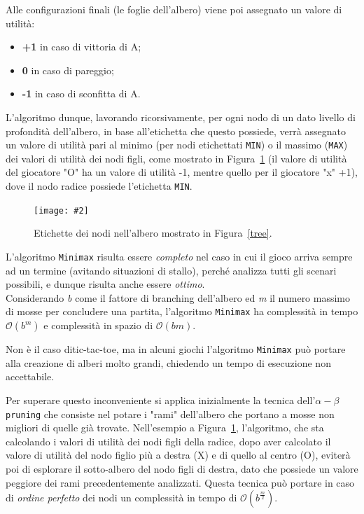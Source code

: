 \documentclass[11pt, a4paper]{article}
\newcommand{\tic}{tic-tac-toe}
\newcommand{\comp}[1]{$\mathcal{O}(#1)$}
\newcommand{\image}[4]{
	\begin{figure}[H]
		\centering
		\texttt{[image: \#2]}
		\caption{#3.}
		\label{#4}
	\end{figure}
}
\begin{document}
Alle configurazioni finali (le foglie dell'albero) viene poi assegnato un valore di utilità:
\begin{itemize}
	\item \textbf{+1} in caso di vittoria di A;
	\item \textbf{0} in caso di pareggio;
	\item \textbf{-1} in caso di sconfitta di A.
\end{itemize}
L'algoritmo dunque, lavorando ricorsivamente, per ogni nodo di un dato livello di profondità dell'albero, in base all'etichetta che questo possiede, verrà assegnato un valore di utilità pari al minimo (per nodi etichettati \texttt{MIN}) o il massimo (\texttt{MAX}) dei valori di utilità dei nodi figli, come mostrato in Figura~\ref{values} (il valore di utilità del giocatore "O" ha un valore di utilità -1, mentre quello per il giocatore "x" +1), dove il nodo radice possiede l'etichetta \texttt{MIN}.

\image{0.5}{minimaxvalues}{Etichette dei nodi nell'albero mostrato in Figura~\ref{tree}}{values}

L'algoritmo \texttt{Minimax} risulta essere \textit{completo} nel caso in cui il gioco arriva sempre ad un termine (avitando situazioni di stallo), perché analizza tutti gli scenari possibili, e dunque risulta anche essere \textit{ottimo}.\\
Considerando \textit{b} come il fattore di branching dell'albero ed \textit{m} il numero massimo di mosse per concludere una partita, l'algoritmo \texttt{Minimax} ha complessità in tempo \comp{b^m} e complessità in spazio di \comp{bm}.

Non è il caso di\tic, ma in alcuni giochi l'algoritmo \texttt{Minimax} può portare alla creazione di alberi molto grandi, chiedendo un tempo di esecuzione non accettabile.

Per superare questo inconveniente si applica inizialmente la tecnica dell'\texttt{$\alpha-\beta$ pruning} che consiste nel potare i "rami" dell'albero che portano a mosse non migliori di quelle già trovate. Nell'esempio a Figura~\ref{values}, l'algoritmo, che sta calcolando i valori di utilità dei nodi figli della radice, dopo aver calcolato il valore di utilità del nodo figlio più a destra (X) e di quello al centro (O), eviterà poi di esplorare il sotto-albero del nodo figli di destra, dato che possiede un valore peggiore dei rami precedentemente analizzati. Questa tecnica può portare in caso di \textit{ordine perfetto} dei nodi un complessità in tempo di \comp{b^{\frac{m}{2}}}.
	
\end{document}
